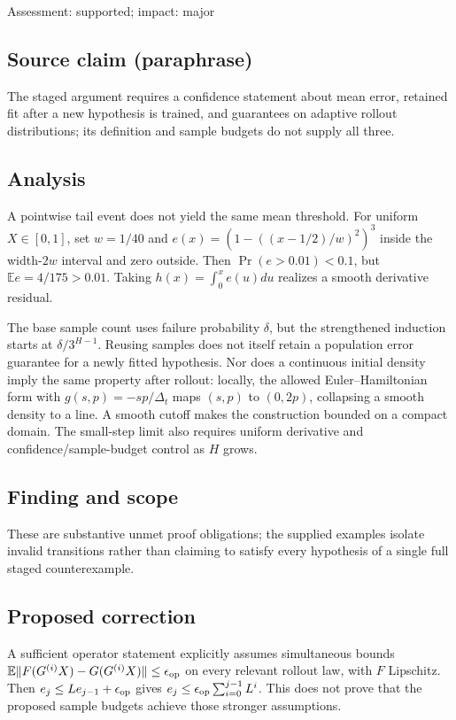 \documentclass[11pt]{article}
\begin{document}
Assessment: supported; impact: major

\subsection*{Source claim (paraphrase)}

The staged argument requires a confidence statement about mean error, retained fit after a new hypothesis is trained, and guarantees on adaptive rollout distributions; its definition and sample budgets do not supply all three.

\subsection*{Analysis}

A pointwise tail event does not yield the same mean threshold. For uniform \(X\in[0,1]\), set \(w=1/40\) and \(e(x)=(1-((x-1/2)/w)^2)^3\) inside the width-\(2w\) interval and zero outside. Then \(\Pr(e>0.01)<0.1\), but \(\mathbb E e=4/175>0.01\). Taking \(h(x)=\int_0^x e(u)du\) realizes a smooth derivative residual.

The base sample count uses failure probability \(\delta\), but the strengthened induction starts at \(\delta/3^{H-1}\). Reusing samples does not itself retain a population error guarantee for a newly fitted hypothesis. Nor does a continuous initial density imply the same property after rollout: locally, the allowed Euler–Hamiltonian form with \(g(s,p)=-sp/\Delta_t\) maps \((s,p)\) to \((0,2p)\), collapsing a smooth density to a line. A smooth cutoff makes the construction bounded on a compact domain. The small-step limit also requires uniform derivative and confidence/sample-budget control as \(H\) grows.

\subsection*{Finding and scope}

These are substantive unmet proof obligations; the supplied examples isolate invalid transitions rather than claiming to satisfy every hypothesis of a single full staged counterexample.

\subsection*{Proposed correction}

A sufficient operator statement explicitly assumes simultaneous bounds \(\mathbb E\|F(G^{(i)}X)-G(G^{(i)}X)\|\le\epsilon_{\rm op}\) on every relevant rollout law, with \(F\) Lipschitz. Then \(e_j\le L e_{j-1}+\epsilon_{\rm op}\) gives \(e_j\le\epsilon_{\rm op}\sum_{i=0}^{j-1}L^i\). This does not prove that the proposed sample budgets achieve those stronger assumptions.
\end{document}
